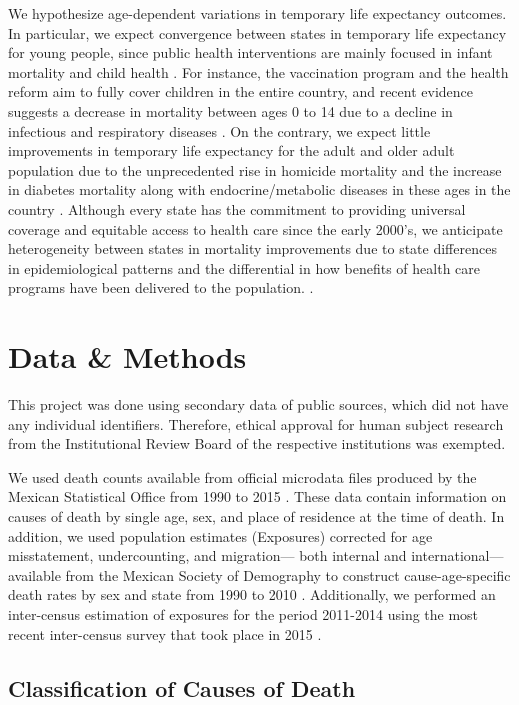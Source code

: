 \documentclass{article}
\begin{document}
\begin{spacing}{1.5}
We hypothesize age-dependent variations in temporary life expectancy outcomes.
In particular, we expect convergence between states in temporary life expectancy
for young people, since public health interventions are mainly focused in infant
mortality and child health . For instance, the vaccination program and the health
reform aim to fully cover children in the entire country, and recent
evidence suggests a decrease in mortality between ages 0 to 14 due to a decline
in infectious and respiratory diseases \citep{canudas2014}. On the contrary, we
expect little improvements in temporary life expectancy for the adult and older
adult population due to the unprecedented rise in homicide mortality and the
increase in diabetes mortality along with endocrine/metabolic diseases in these ages in the country \citep{canudas2014}. Although every
state has the commitment to providing universal coverage and equitable access to
health care since the early 2000's, we anticipate heterogeneity between states
in mortality improvements due to state differences in epidemiological patterns and the differential in how benefits of health care programs have been delivered to the population.
\citep{Frenk2006}.


\section*{Data \& Methods} 
 This project was done using secondary data of public sources, which did not have any individual identifiers. Therefore, ethical approval for human subject research from the Institutional Review Board of the respective institutions was exempted. 
 
We used death counts available from official microdata files produced by the
Mexican Statistical Office from 1990 to 2015 \citep{INEGI}. These data contain
information on causes of death by single age, sex, and place of residence at the
time of death. In addition, we used population estimates (Exposures) corrected
for age misstatement, undercounting, and migration--- both internal and
international--- available from the Mexican Society of Demography to construct
cause-age-specific death rates by sex and state from 1990 to 2010 \citep{SOMEDE}. Additionally, we performed an inter-census estimation of exposures for the period 2011-2014 using the most recent inter-census survey that took place in 2015  \citep{INEGI}. 

\subsection*{Classification of Causes of Death}


\end{spacing}
\end{document}
